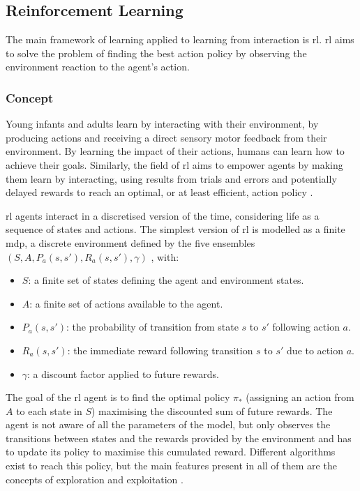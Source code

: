 \subsection{Reinforcement Learning} \label{ssec:back_rl}

The main framework of learning applied to learning from interaction is \acrfull{rl}. \gls{rl} aims to solve the problem of finding the best action policy by observing the environment reaction to the agent's action.

\subsubsection{Concept} 
	Young infants and adults learn by interacting with their environment, by producing actions and receiving a direct sensory motor feedback from their environment. By learning the impact of their actions, humans can learn how to achieve their goals. Similarly, the field of \gls{rl} aims to empower agents by making them learn by interacting, using results from trials and errors and potentially delayed rewards to reach an optimal, or at least efficient, action policy \citep{sutton1998reinforcement}. 

	\gls{rl} agents interact in a discretised version of the time, considering life as a sequence of states and actions. The simplest version of \gls{rl} is modelled as a finite \gls{mdp}, a discrete environment defined by the five ensembles $(S, A, P_a(s,s'), R_a(s,s'), \gamma)$ \citep{howard1960dynamic}, with:
	\begin{itemize}
		\item $S$: a finite set of states defining the agent and environment states.
		\item $A$: a finite set of actions available to the agent.
		\item $P_a(s,s')$: the probability of transition from state $s$ to $s'$ following action $a$.
		\item $R_a(s,s')$: the immediate reward following transition $s$ to $s'$ due to action $a$.
		\item $\gamma$: a discount factor applied to future rewards.
	\end{itemize}
	
	The goal of the \gls{rl} agent is to find the optimal policy $\pi_*$ (assigning an action from $A$ to each state in $S$) maximising the discounted sum of future rewards. The agent is not aware of all the parameters of the model, but only observes the transitions between states and the rewards provided by the environment and has to update its policy to maximise this cumulated reward. Different algorithms exist to reach this policy, but the main features present in all of them are the concepts of exploration and exploitation \citep{sutton1998reinforcement}.
	
